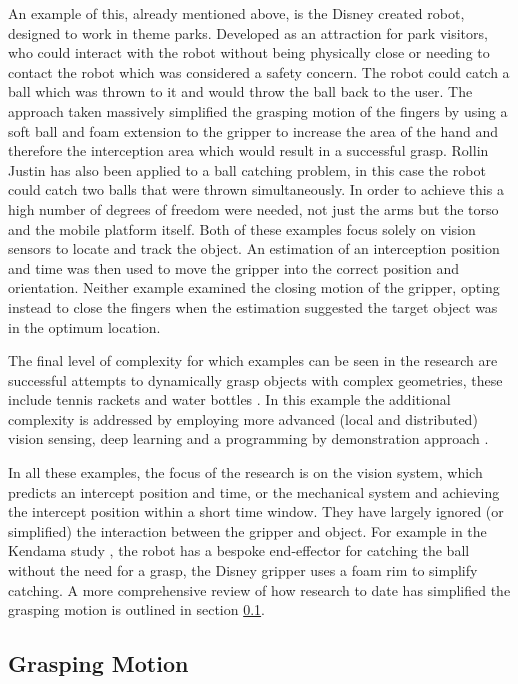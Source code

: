 An example of this, already mentioned above, is the Disney created robot, designed to work in theme parks. Developed as an attraction for park visitors, who could interact with the robot without being physically close or needing to contact the robot which was considered a safety concern. The robot could catch a ball which was thrown to it and would throw the ball back to the user. The approach taken massively simplified the grasping motion of the fingers by using a soft ball and foam extension to the gripper to increase the area of the hand and therefore the interception area which would result in a successful grasp. Rollin Justin has also been applied to a ball catching problem, in this case the robot could catch two balls that were thrown simultaneously. In order to achieve this a high number of degrees of freedom were needed, not just the arms but the torso and the mobile platform itself. Both of these examples focus solely on vision sensors to locate and track the object. An estimation of an interception position and time was then used to move the gripper into the correct position and orientation. Neither example examined the closing motion of the gripper, opting instead to close the fingers when the estimation suggested the target object was in the optimum location. 

The final level of complexity for which examples can be seen in the research are successful attempts to dynamically grasp objects with complex geometries, these include tennis rackets and water bottles \cite{TennisRacket}. In this example the additional complexity is addressed by employing more advanced (local and distributed) vision sensing, deep learning and a programming by demonstration approach \cite{TennisRacket}.

In all these examples, the focus of the research is on the vision system, which predicts an intercept position and time, or the mechanical system and achieving the intercept position within a short time window. They have largely ignored (or simplified) the interaction between the gripper and object. For example in the Kendama study \cite{Kendama}, the robot has a bespoke end-effector for catching the ball without the need for a grasp, the Disney gripper \cite{DisneyRobot} uses a foam rim to simplify catching. A more comprehensive review of how research to date has simplified the grasping motion is outlined in section \ref{GraspingMotion}.

\subsection{Grasping Motion}\label{GraspingMotion}

